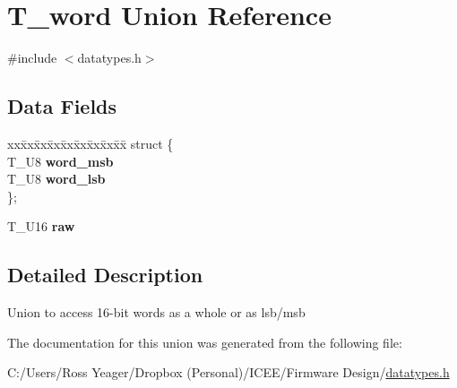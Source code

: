 \hypertarget{union_t__word}{}\section{T\+\_\+word Union Reference}
\label{union_t__word}


{\ttfamily \#include $<$datatypes.\+h$>$}

\subsection*{Data Fields}
\begin{DoxyCompactItemize}
\item 
\hypertarget{union_t__word_a92d39fd00fe60781613c082ae21be718}{}\begin{tabbing}
xx\=xx\=xx\=xx\=xx\=xx\=xx\=xx\=xx\=\kill
struct \{\\
\>T\_U8 {\bfseries word\_msb}\\
\>T\_U8 {\bfseries word\_lsb}\\
\}; \label{union_t__word_a92d39fd00fe60781613c082ae21be718}
\\

\end{tabbing}\item 
\hypertarget{union_t__word_a96c3c22259fef71a02f88a1946bd7b24}{}T\+\_\+\+U16 {\bfseries raw}\label{union_t__word_a96c3c22259fef71a02f88a1946bd7b24}

\end{DoxyCompactItemize}


\subsection{Detailed Description}
Union to access 16-\/bit words as a whole or as lsb/msb 

The documentation for this union was generated from the following file\+:\begin{DoxyCompactItemize}
\item 
C\+:/\+Users/\+Ross Yeager/\+Dropbox (\+Personal)/\+I\+C\+E\+E/\+Firmware Design/\hyperlink{datatypes_8h}{datatypes.\+h}\end{DoxyCompactItemize}

